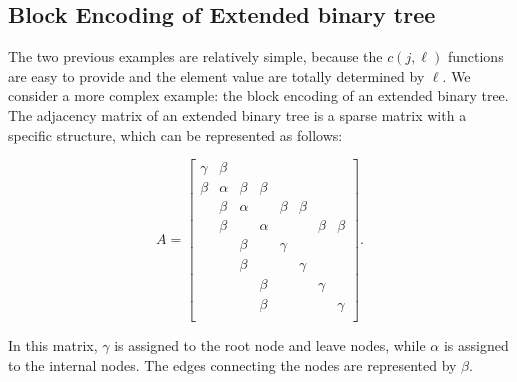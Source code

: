\documentclass{article}
\begin{document}
\subsection{Block Encoding of Extended binary tree}

The two previous examples are relatively simple, because the $c(j, \ell)$ functions are easy to provide and the element value are totally determined by $\ell$. We consider a more complex example: the block encoding of an extended binary tree. The adjacency matrix of an extended binary tree is a sparse matrix with a specific structure, which can be represented as follows:

\begin{figure}[htbp]
  \centering
  \begin{minipage}{0.35\textwidth}
    \centering
  \end{minipage}
  \hfill
  \begin{minipage}{0.6\textwidth}
    \centering
    \[
      A =
      \begin{bmatrix}
        \gamma & \beta \\
        \beta & \alpha & \beta & \beta \\
        & \beta & \alpha & & \beta & \beta \\
        & \beta & & \alpha & & & \beta & \beta \\
        & & \beta & &\gamma \\
        & & \beta & & &\gamma \\
        & & & \beta & & &\gamma \\
        & & & \beta & & & &\gamma \\
      \end{bmatrix}.
    \]
  \end{minipage}
\end{figure}

In this matrix, $\gamma$ is assigned to the root node and leave nodes, while $\alpha$ is assigned to the internal nodes. The edges connecting the nodes are represented by $\beta$.



\end{document}
